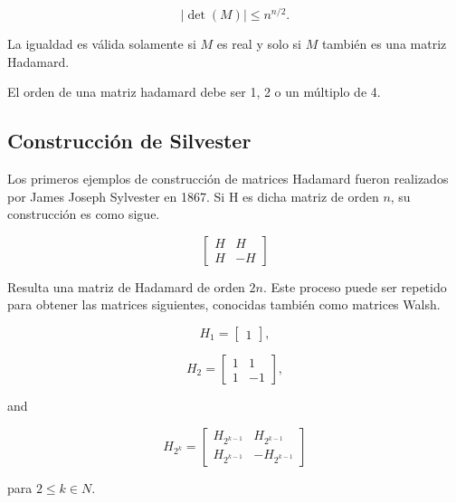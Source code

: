 $$ |\operatorname{det}(M)| \leq n^{n/2}. $$

La igualdad es válida solamente si $M$ es real y solo si $M$ también es una matriz Hadamard.

El orden de una matriz hadamard debe ser 1, 2 o un múltiplo de 4.

\subsection{Construcción de Silvester}

Los primeros ejemplos de construcción de matrices Hadamard fueron realizados por James Joseph Sylvester en 1867. Si H es 
dicha matriz de orden $n$, su construcción es como sigue.

$$ \begin{bmatrix} H & H\\H & -H\end{bmatrix} $$

Resulta una matriz de Hadamard de orden $2n$. Este proceso puede ser repetido para obtener las matrices siguientes, 
conocidas también como matrices Walsh. 

$$ H_1 = \begin{bmatrix} 1 \end{bmatrix}, $$

$$  H_2 = \begin{bmatrix} 1 & 1 \\ 1 & -1 \end{bmatrix}, $$

and

$$ H_{2^k} = \begin{bmatrix} H_{2^{k-1}} & H_{2^{k-1}}\\ H_{2^{k-1}} & -H_{2^{k-1}}\end{bmatrix} $$

para $2 \le k \in N$.

